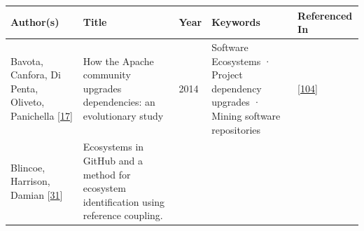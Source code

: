 \documentclass[]{book}
\begin{document}
\begin{longtable}[]{@{}lllll@{}}
\toprule
\begin{minipage}[b]{0.12\columnwidth}\raggedright\strut
Author(s)\strut
\end{minipage} & \begin{minipage}[b]{0.31\columnwidth}\raggedright\strut
Title\strut
\end{minipage} & \begin{minipage}[b]{0.02\columnwidth}\raggedright\strut
Year\strut
\end{minipage} & \begin{minipage}[b]{0.24\columnwidth}\raggedright\strut
Keywords\strut
\end{minipage} & \begin{minipage}[b]{0.16\columnwidth}\raggedright\strut
Referenced In\strut
\end{minipage}\tabularnewline
\midrule
\endhead
\begin{minipage}[t]{0.12\columnwidth}\raggedright\strut
Bavota, Canfora, Di Penta, Oliveto, Panichella
{[}\protect\hyperlink{ref-Bavota2014}{17}{]}\strut
\end{minipage} & \begin{minipage}[t]{0.31\columnwidth}\raggedright\strut
How the Apache community upgrades dependencies: an evolutionary
study\strut
\end{minipage} & \begin{minipage}[t]{0.02\columnwidth}\raggedright\strut
2014\strut
\end{minipage} & \begin{minipage}[t]{0.24\columnwidth}\raggedright\strut
Software Ecosystems · Project dependency upgrades · Mining software
repositories\strut
\end{minipage} & \begin{minipage}[t]{0.16\columnwidth}\raggedright\strut
{[}\protect\hyperlink{ref-Kula2017}{104}{]}\strut
\end{minipage}\tabularnewline
\begin{minipage}[t]{0.12\columnwidth}\raggedright\strut
Blincoe, Harrison, Damian
{[}\protect\hyperlink{ref-Blincoe2015}{31}{]}\strut
\end{minipage} & \begin{minipage}[t]{0.31\columnwidth}\raggedright\strut
Ecosystems in GitHub and a method for ecosystem identification using
reference coupling.\strut
\end{minipage} & \begin{minipage}[t]{0.02\columnwidth}\raggedright\strut

\end{minipage}
\end{longtable}
\end{document}
